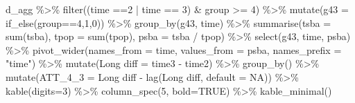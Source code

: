 \documentclass[
]{article}
\newenvironment{Shaded}{\begin{snugshade}}{\end{snugshade}}
\newcommand{\AttributeTok}[1]{\textcolor[rgb]{0.77,0.63,0.00}{#1}}
\newcommand{\ConstantTok}[1]{\textcolor[rgb]{0.00,0.00,0.00}{#1}}
\newcommand{\DecValTok}[1]{\textcolor[rgb]{0.00,0.00,0.81}{#1}}
\newcommand{\FunctionTok}[1]{\textcolor[rgb]{0.00,0.00,0.00}{#1}}
\newcommand{\NormalTok}[1]{#1}
\newcommand{\OtherTok}[1]{\textcolor[rgb]{0.56,0.35,0.01}{#1}}
\newcommand{\SpecialCharTok}[1]{\textcolor[rgb]{0.00,0.00,0.00}{#1}}
\newcommand{\StringTok}[1]{\textcolor[rgb]{0.31,0.60,0.02}{#1}}
\begin{document}
\begin{Shaded}
\begin{Highlighting}[]
\NormalTok{d\_agg }\SpecialCharTok{\%\textgreater{}\%} \FunctionTok{filter}\NormalTok{((time }\SpecialCharTok{==}\DecValTok{2} \SpecialCharTok{|}\NormalTok{ time }\SpecialCharTok{==} \DecValTok{3}\NormalTok{) }\SpecialCharTok{\&}\NormalTok{ group }\SpecialCharTok{\textgreater{}=} \DecValTok{4}\NormalTok{) }\SpecialCharTok{\%\textgreater{}\%}
  \FunctionTok{mutate}\NormalTok{(}\AttributeTok{g43 =} \FunctionTok{if\_else}\NormalTok{(group}\SpecialCharTok{==}\DecValTok{4}\NormalTok{,}\DecValTok{1}\NormalTok{,}\DecValTok{0}\NormalTok{)) }\SpecialCharTok{\%\textgreater{}\%}
  \FunctionTok{group\_by}\NormalTok{(g43, time) }\SpecialCharTok{\%\textgreater{}\%}
  \FunctionTok{summarise}\NormalTok{(}\AttributeTok{tsba =} \FunctionTok{sum}\NormalTok{(tsba),}
            \AttributeTok{tpop =} \FunctionTok{sum}\NormalTok{(tpop),}
            \AttributeTok{psba =}\NormalTok{ tsba }\SpecialCharTok{/}\NormalTok{ tpop) }\SpecialCharTok{\%\textgreater{}\%}
  \FunctionTok{select}\NormalTok{(g43, time, psba) }\SpecialCharTok{\%\textgreater{}\%}
  \FunctionTok{pivot\_wider}\NormalTok{(}\AttributeTok{names\_from =}\NormalTok{ time, }\AttributeTok{values\_from =}\NormalTok{ psba,}
              \AttributeTok{names\_prefix =} \StringTok{"time"}\NormalTok{) }\SpecialCharTok{\%\textgreater{}\%}
  \FunctionTok{mutate}\NormalTok{(}\StringTok{\textasciigrave{}}\AttributeTok{Long diff}\StringTok{\textasciigrave{}} \OtherTok{=} \StringTok{\textasciigrave{}}\AttributeTok{time3}\StringTok{\textasciigrave{}} \SpecialCharTok{{-}} \StringTok{\textasciigrave{}}\AttributeTok{time2}\StringTok{\textasciigrave{}}\NormalTok{) }\SpecialCharTok{\%\textgreater{}\%}
  \FunctionTok{group\_by}\NormalTok{() }\SpecialCharTok{\%\textgreater{}\%}
  \FunctionTok{mutate}\NormalTok{(}\AttributeTok{ATT\_4\_3 =} \StringTok{\textasciigrave{}}\AttributeTok{Long diff}\StringTok{\textasciigrave{}} \SpecialCharTok{{-}} \FunctionTok{lag}\NormalTok{(}\StringTok{\textasciigrave{}}\AttributeTok{Long diff}\StringTok{\textasciigrave{}}\NormalTok{, }\AttributeTok{default =} \ConstantTok{NA}\NormalTok{)) }\SpecialCharTok{\%\textgreater{}\%}
  \FunctionTok{kable}\NormalTok{(}\AttributeTok{digits=}\DecValTok{3}\NormalTok{) }\SpecialCharTok{\%\textgreater{}\%}
  \FunctionTok{column\_spec}\NormalTok{(}\DecValTok{5}\NormalTok{, }\AttributeTok{bold=}\ConstantTok{TRUE}\NormalTok{) }\SpecialCharTok{\%\textgreater{}\%}
  \FunctionTok{kable\_minimal}\NormalTok{()}
\end{Highlighting}
\end{Shaded}
\end{document}
